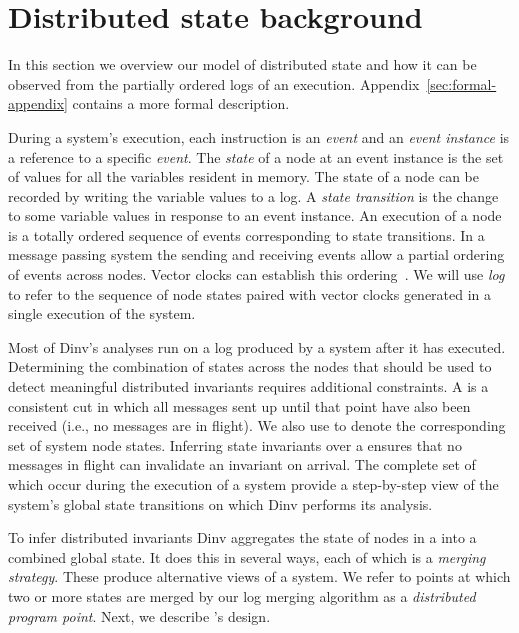 \section{Distributed state background}
\label{sec:formal}

%


In this section we overview our model of distributed state and how it
can be observed from the partially ordered logs of an
execution. Appendix~\ref{sec:formal-appendix} contains a more formal
description.

During a system's execution, each instruction is an \emph{event} and an
\emph{event instance} is a reference to a specific \emph{event}. The
\emph{state} of a node at an event instance is the set of values for
all the variables resident in memory.  The state of a node can be
recorded by writing the variable values to a log.  A \emph{state
  transition} is the change to some variable values in response to an
event instance. An execution of a node is a totally ordered sequence
of events corresponding to state transitions.
%
In a message passing system the sending and receiving events allow a
partial ordering of events across nodes. Vector clocks can
establish this ordering~\cite{mattern_vector_clocks_1989}. We will use
\emph{log} to refer to the sequence of node states paired with vector
clocks generated in a single execution of the system.

Most of Dinv's analyses run on a log produced by a system
after it has executed. Determining the combination of states across
the nodes that should be used to detect meaningful distributed
invariants requires additional constraints.
% 
A \emph{\scc} is a consistent cut in which all messages sent up until
that point have also been received (i.e., no messages are in flight). We
also use \scc to denote the corresponding set of system node states.
%
Inferring state invariants over a \scc ensures that no messages in
flight can invalidate an invariant on arrival. The complete set of
 which occur during the execution of a system provide a
step-by-step view of the system's global state transitions on which
Dinv performs its analysis.

To infer distributed invariants Dinv aggregates the state of nodes in
a \scc into a combined global state. It does this in several ways,
each of which is a \emph{merging strategy}. These produce alternative
views of a system. We refer to points at which two or more states are
merged by our log merging algorithm as a \emph{distributed program
  point}. %
Next, we describe \dinv's design.
%
